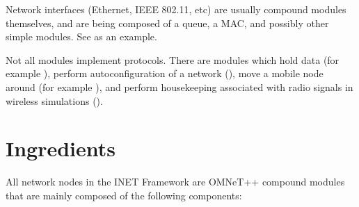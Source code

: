 Network interfaces (Ethernet, IEEE 802.11, etc) are usually compound modules
themselves, and are being composed of a queue, a MAC, and possibly other
simple modules. See  as an example.

Not all modules implement protocols. There are modules which hold data (for
example ), perform autoconfiguration of a network
(), move a mobile node around (for example
), and perform housekeeping associated with
radio signals in wireless simulations ().


\section{Ingredients}

All network nodes in the INET Framework are OMNeT++ compound modules that are
mainly composed of the following components:

